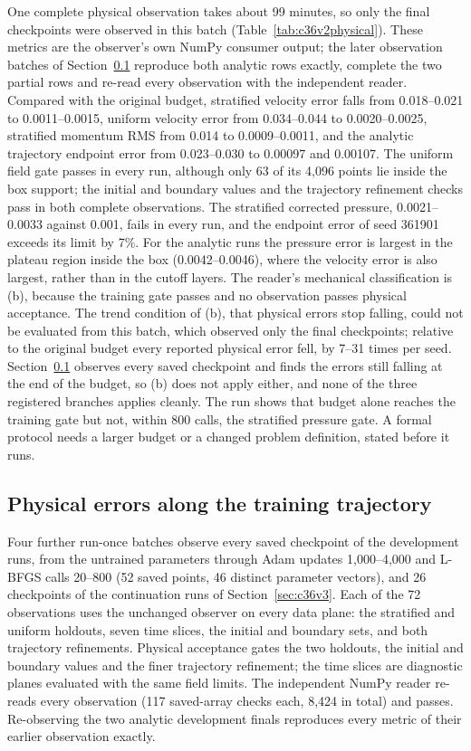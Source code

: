 \documentclass[11pt]{article}
\begin{document}
One complete physical observation takes about 99 minutes, so only the
final checkpoints were observed in this batch (Table~\ref{tab:c36v2physical}).
These metrics are the observer's own NumPy consumer output; the later
observation batches of Section~\ref{sec:c36trend} reproduce both analytic
rows exactly, complete the two partial rows and re-read every observation
with the independent reader. Compared
with the original budget, stratified velocity error falls from
0.018--0.021 to 0.0011--0.0015, uniform velocity error from 0.034--0.044 to
0.0020--0.0025, stratified momentum RMS from 0.014 to 0.0009--0.0011, and
the analytic trajectory endpoint error from 0.023--0.030 to 0.00097 and
0.00107. The uniform field gate passes in every run, although only 63 of
its 4,096 points lie inside the box support; the initial and boundary values
and the trajectory refinement checks pass in both complete observations. The stratified corrected pressure,
0.0021--0.0033 against 0.001, fails in every run, and the endpoint error of
seed 361901 exceeds its limit by 7\%. For the analytic runs the pressure
error is largest in the plateau region inside the box (0.0042--0.0046),
where the velocity error is also largest, rather than in the cutoff layers.
The reader's mechanical classification is (b), because the training gate
passes and no observation passes physical acceptance. The trend condition
of (b), that physical errors stop falling, could not be evaluated from this
batch, which observed only the final checkpoints; relative to the original
budget every reported physical error fell, by 7--31 times per seed.
Section~\ref{sec:c36trend} observes every saved checkpoint and finds the
errors still falling at the end of the budget, so (b) does not apply either,
and none of the three registered branches applies cleanly. The run shows
that budget alone reaches the training gate but not, within 800 calls, the
stratified pressure gate. A formal protocol needs a larger budget or a
changed problem definition, stated before it runs.

\subsection{Physical errors along the training trajectory}\label{sec:c36trend}
Four further run-once batches observe every saved checkpoint of the
development runs, from the untrained parameters through Adam updates
1,000--4,000 and L-BFGS calls 20--800 (52 saved points, 46 distinct
parameter vectors), and 26 checkpoints of the continuation runs of
Section~\ref{sec:c36v3}. Each of the 72 observations uses the unchanged
observer on every data plane: the stratified and uniform holdouts, seven time
slices, the initial and boundary sets, and both trajectory refinements.
Physical acceptance gates the two holdouts, the initial and boundary values
and the finer trajectory refinement; the time slices are diagnostic planes
evaluated with the same field limits. The independent NumPy reader re-reads
every observation (117 saved-array checks each, 8,424 in total) and passes.
Re-observing the two analytic development finals reproduces every metric of
their earlier observation exactly.
\end{document}
